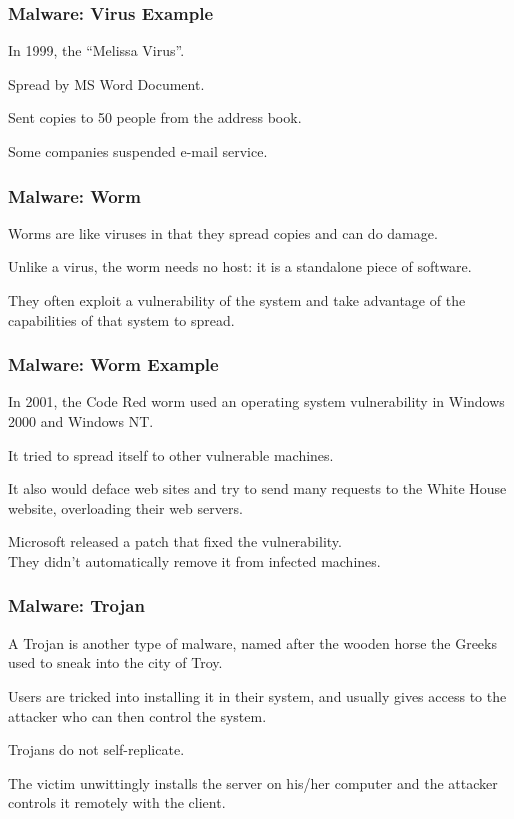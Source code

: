 \begin{frame}
\frametitle{Malware: Virus Example}
\begin{changemargin}{1cm}

In 1999, the ``Melissa Virus''.

Spread by MS Word Document.

Sent copies to 50 people from the address book.

Some companies suspended e-mail service.

\end{changemargin}
\end{frame}


\begin{frame}
\frametitle{Malware: Worm}
\begin{changemargin}{1cm}

Worms are like viruses in that they spread copies and can do damage.

Unlike a virus, the worm needs no host: it is a standalone piece of software. 

They often exploit a vulnerability of the system and take advantage of the capabilities of that system to spread.

\end{changemargin}
\end{frame}

\begin{frame}
\frametitle{Malware: Worm Example}
\begin{changemargin}{1cm}

In 2001, the Code Red worm used an operating system vulnerability in Windows 2000 and Windows NT. 

It tried to spread itself to other vulnerable machines.

It also would deface web sites and try to send many requests to the White House website, overloading their web servers. 

Microsoft released a patch that fixed the vulnerability.\\
\quad They  didn't automatically remove it from infected machines.
\end{changemargin}
\end{frame}


\begin{frame}
\frametitle{Malware: Trojan}
\begin{changemargin}{1cm}
A Trojan is another type of malware, named after the wooden horse the Greeks used to sneak into the city of Troy.

Users are tricked into installing it in their system, and usually gives access to the attacker who can then control the system. 

Trojans do not self-replicate.

The victim unwittingly installs the server on his/her computer and the attacker controls it remotely with the client.

\end{changemargin}
\end{frame}

